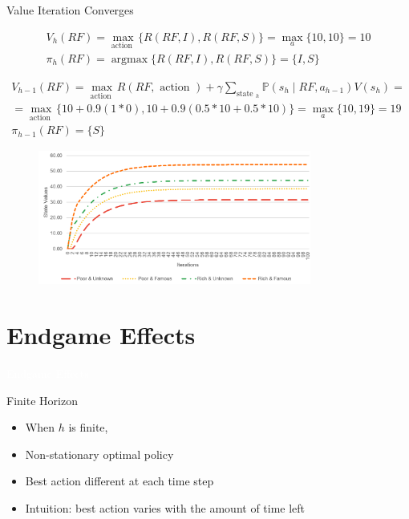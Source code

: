 \documentclass[11pt,table]{beamer}
\begin{document}
\begin{frame}{Value Iteration Converges}

\footnotesize
$$
\begin{gathered}
V_{h}(R F)=\max _{\text {action }}\{R(R F, I), R(R F, S)\}=\max _{a}\{10,10\}=10 \\
\pi_{h}(R F)=\operatorname{argmax}\{R(R F, I), R(R F, S)\}=\{I, S\}
\end{gathered}
$$

$$
\begin{gathered}
V_{h-1}(R F)=\max _{\text {action }} R(R F, \text { action })+\gamma \sum_{\text {state }_{h}} \mathbb{P}\left(s_{h} \mid R F, a_{h-1}\right) V\left(s_{h}\right)= \\
=\max _{\text {action }}\{10+0.9(1 * 0), 10+0.9(0.5 * 10+0.5 * 10)\}=\max _{a}\{10,19\}=19 \\
\pi_{h-1}(R F)=\{S\}
\end{gathered}
$$

\begin{figure}
	\centering
		\includegraphics[width=0.80\textwidth]{figures/values_convergence.png}
	\label{fig:values_convergence}
\end{figure}

    
\end{frame}

\section{Endgame Effects}
{
\begin{frame}
\centering
\Huge
\textcolor{white}{Endgame Effects}
\thispagestyle{empty}
\end{frame}
}

\begin{frame}{Finite Horizon}

\begin{itemize}
\item When $h$ is finite,
\item \textcolor{red1}{Non-stationary} optimal policy
\item Best action different at each time step
\item Intuition: best action varies with the amount of time  left
 
\end{itemize}
    
\end{frame}
\end{document}
